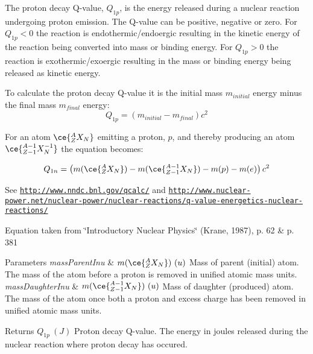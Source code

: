 The proton decay Q-\/value, $Q_{1p}$, is the energy released during a nuclear reaction undergoing proton emission. The Q-\/value can be positive, negative or zero. For $Q_{1p} < 0$ the reaction is endothermic/endoergic resulting in the kinetic energy of the reaction being converted into mass or binding energy. For $Q_{1p} > 0$ the reaction is exothermic/exoergic resulting in the mass or binding energy being released as kinetic energy.

To calculate the proton decay Q-\/value it is the initial mass $m_{initial}$ energy minus the final mass $m_{final}$ energy\+: \[Q_{1p} = \left ( m_{initial}-m_{final}\right ) c^2\]

For an atom $\ce{ ^{A}_{Z}X_{N} }$ emitting a proton, $p$, and thereby producing an atom $\ce{ ^{A-1}_{Z-1}X^{-1}_{N} }$ the equation becomes\+:

\[Q_{1n} = \left ( m(\ce{ ^{A}_{Z}X_{N} }) - m(\ce{ ^{A-1}_{Z-1}X_{N} }) - m(p) - m(e)\right ) c^2\]

See \href{http://www.nndc.bnl.gov/qcalc/}{\tt http\+://www.\+nndc.\+bnl.\+gov/qcalc/} and \href{http://www.nuclear-power.net/nuclear-power/nuclear-reactions/q-value-energetics-nuclear-reactions/}{\tt http\+://www.\+nuclear-\/power.\+net/nuclear-\/power/nuclear-\/reactions/q-\/value-\/energetics-\/nuclear-\/reactions/}

Equation taken from \char`\"{}\+Introductory Nuclear Physics\char`\"{} (Krane, 1987), p. 62 \& p. 381


\begin{DoxyParams}{Parameters}
{\em mass\+Parent\+Inu} & $m(\ce{ ^{A}_{Z}X_{N} })\ (u)$ Mass of parent (initial) atom. The mass of the atom before a proton is removed in unified atomic mass units. \\
\hline
{\em mass\+Daughter\+Inu} & $m(\ce{ ^{A-1}_{Z-1}X_{N} })\ (u)$ Mass of daughter (produced) atom. The mass of the atom once both a proton and excess charge has been removed in unified atomic mass units. \\
\hline
\end{DoxyParams}
\begin{DoxyReturn}{Returns}
$Q_{1p}\ (J)$ Proton decay Q-\/value. The energy in joules released during the nuclear reaction where proton decay has occured. 
\end{DoxyReturn}
\mbox{\label{group___q_value_ga514354518df3bf1cde561b6d75879ef0}} 
